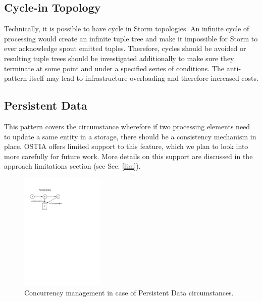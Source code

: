\subsection{Cycle-in Topology}

Technically, it is possible to have cycle in Storm topologies. An infinite cycle of processing would create an infinite tuple tree and make it impossible for Storm to ever acknowledge spout emitted tuples. Therefore, cycles should be avoided or resulting tuple trees should be investigated additionally to make sure they terminate at some point and under a specified series of conditions. The anti-pattern itself may lead to infrastructure overloading and therefore increased costs.


\subsection{Persistent Data}

This pattern covers the circumstance wherefore if two processing elements need to update a same entity in a storage, there should be a consistency mechanism in place. OSTIA offers limited support to this feature, which we plan to look into more carefully for future work. More details on this support are discussed in the approach limitations section (see Sec. \ref{lim}).

\begin{figure}[H]
	\begin{center}
		\includegraphics[width=4cm]{images/persistence}
		\caption{Concurrency management in case of Persistent Data circumstances.}
		\label{fig:persistence}
	\end{center}
\end{figure}


